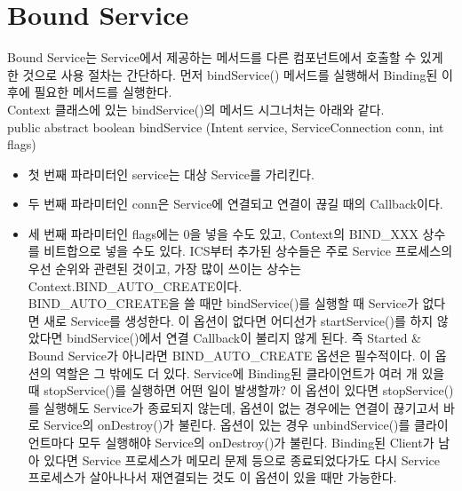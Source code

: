 \section{Bound Service}
Bound Service는 Service에서 제공하는 메서드를 다른 컴포넌트에서 호출할 수 있게 한 것으로 사용 절차는 간단하다. 먼저 bindService() 메서드를 실행해서 Binding된 이후에 필요한 메서드를 실행한다.\\

Context 클래스에 있는 bindService()의 메서드 시그너처는 아래와 같다.\\
public abstract boolean  bindService (Intent service, ServiceConnection conn, int flags)\\
\begin{itemize}
\item 첫 번째 파라미터인 service는 대상 Service를 가리킨다.
\item 두 번째 파라미터인 conn은 Service에 연결되고 연결이 끊길 때의 Callback이다.
\item 세 번째 파라미터인 flags에는 0을 넣을 수도 있고, Context의 BIND\_XXX 상수를 비트합으로 넣을 수도 있다. ICS부터 추가된 상수들은 주로 Service 프로세스의 우선 순위와 관련된 것이고, 가장 많이 쓰이는 상수는 Context.BIND\_AUTO\_CREATE이다.\\

BIND\_AUTO\_CREATE을 쓸 때만 bindService()를 실행할 때 Service가 없다면 새로 Service를 생성한다. 이 옵션이 없다면 어디선가 startService()를 하지 않았다면 bindService()에서 연결 Callback이 불리지 않게 된다.
즉 Started \& Bound Service가 아니라면 BIND\_AUTO\_CREATE 옵션은 필수적이다. 
이 옵션의 역할은 그 밖에도 더 있다. 
Service에 Binding된 클라이언트가 여러 개 있을 때 stopService()를 실행하면 어떤 일이 발생할까? 이 옵션이 있다면 stopService()를 실행해도 Service가 종료되지 않는데, 옵션이 없는 경우에는 연결이 끊기고서 바로 Service의 onDestroy()가 불린다.
옵션이 있는 경우 unbindService()를 클라이언트마다 모두 실행해야 Service의 onDestroy()가 불린다.
Binding된 Client가 남아 있다면 Service 프로세스가 메모리 문제 등으로 종료되었다가도 다시 Service 프로세스가 살아나나서 재연결되는 것도 이 옵션이 있을 때만 가능한다. 
\end{itemize}

